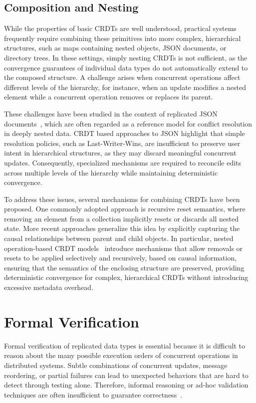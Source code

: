 \subsection{Composition and Nesting}
\label{sub:nesting}

While the properties of basic CRDTs are well understood, practical systems frequently require combining these primitives into more complex, hierarchical structures, such as maps containing nested objects, JSON documents, or directory trees. In these settings, simply nesting CRDTs is not sufficient, as the convergence guarantees of individual data types do not automatically extend to the composed structure. A challenge arises when concurrent operations affect different levels of the hierarchy, for instance, when an update modifies a nested element while a concurrent operation removes or replaces its parent.

These challenges have been studied in the context of replicated JSON documents~\cite{kleppmann2017json}, which are often regarded as a reference model for conflict resolution in deeply nested data. CRDT based approaches to JSON highlight that simple resolution policies, such as Last-Writer-Wins, are insufficient to preserve user intent in hierarchical structures, as they may discard meaningful concurrent updates. Consequently, specialized mechanisms are required to reconcile edits across multiple levels of the hierarchy while maintaining deterministic convergence.

To address these issues, several mechanisms for combining CRDTs have been proposed. One commonly adopted approach is recursive reset semantics, where removing an element from a collection implicitly resets or discards all nested state. More recent approaches generalize this idea by explicitly capturing the causal relationships between parent and child objects. In particular, nested operation-based CRDT models~\cite{baquero2017nested} introduce mechanisms that allow removals or resets to be applied selectively and recursively, based on causal information, ensuring that the semantics of the enclosing structure are preserved, providing deterministic convergence for complex, hierarchical CRDTs without introducing excessive metadata overhead.

\section{Formal Verification}
\label{sec:verification}

Formal verification of replicated data types is essential because it is difficult to reason about the many possible execution orders of concurrent operations in distributed systems. Subtle combinations of concurrent updates, message reordering, or partial failures can lead to unexpected behaviors that are hard to detect through testing alone. Therefore, informal reasoning or ad-hoc validation techniques are often insufficient to guarantee correctness~\cite{borrego2025convergence}.

